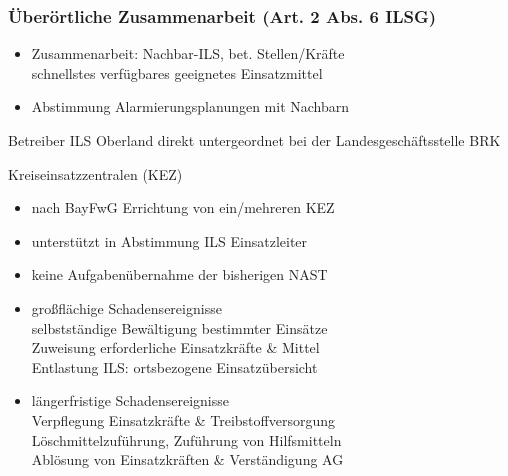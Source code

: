 \begin{normbox}{\subsubsection{Überörtliche Zusammenarbeit (Art. 2 Abs. 6 ILSG)}}
    \begin{itemize}
        \item Zusammenarbeit: Nachbar-ILS, bet. Stellen/Kräfte\\
        \ra schnellstes verfügbares geeignetes Einsatzmittel
        \item Abstimmung Alarmierungsplanungen mit Nachbarn
    \end{itemize}
\end{normbox}
\begin{warningbox}{Betreiber ILS Oberland}
    direkt untergeordnet bei der Landesgeschäftsstelle BRK
\end{warningbox}
 \begin{sectionbox}{Kreiseinsatzzentralen (KEZ)}
    \begin{itemize}
        \item nach BayFwG Errichtung von ein/mehreren KEZ
        \item unterstützt in Abstimmung ILS Einsatzleiter
        \item keine Aufgabenübernahme der bisherigen NAST
        \item großflächige Schadensereignisse\\
        \ra selbstständige Bewältigung bestimmter Einsätze\\
        \ra Zuweisung erforderliche Einsatzkräfte \& Mittel\\
        \ra Entlastung ILS: ortsbezogene Einsatzübersicht
        \item längerfristige Schadensereignisse\\
        \ra Verpflegung Einsatzkräfte \& Treibstoffversorgung\\
        \ra Löschmittelzuführung, Zuführung von Hilfsmitteln\\
        \ra Ablösung von Einsatzkräften \& Verständigung AG
    \end{itemize}
\end{sectionbox}